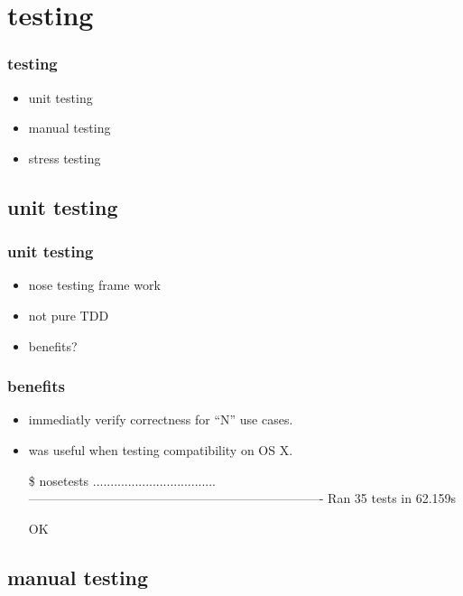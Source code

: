 
\section{testing}

\begin{frame}
  \frametitle{testing}
  \pause
  \begin{itemize}
  \item unit testing
  \item manual testing
  \item stress testing
  \end{itemize}
\end{frame}


\subsection{unit testing}

\begin{frame}
  \frametitle{unit testing}
  \begin{itemize}
  \item<2-> nose testing frame work
  \item<3-> not pure TDD
  \item<4-> benefits?
  \end{itemize}
\end{frame}

\begin{frame}[fragile]
  \frametitle{benefits}
  \begin{itemize}
  \item<1-> immediatly verify correctness for ``N'' use cases.
  \item<2-> was useful when testing compatibility on OS X.
{\tiny
\begin{semiverbatim}
\$ nosetests
...................................
----------------------------------------------------------------------
Ran 35 tests in 62.159s

OK
\end{semiverbatim}
}
  \end{itemize}
\end{frame}


\subsection{manual testing}

